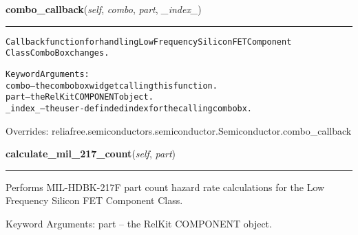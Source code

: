 \hspace{.8\funcindent}\begin{boxedminipage}{\funcwidth}

    \raggedright \textbf{combo\_callback}(\textit{self}, \textit{combo}, \textit{part}, \textit{\_index\_})

    \vspace{-1.5ex}

    \rule{\textwidth}{0.5\fboxrule}
\setlength{\parskip}{2ex}
\begin{alltt}
Callback function for handling Low Frequency Silicon FET Component
Class ComboBox changes.

Keyword Arguments:
  combo -- the combobox widget calling this function.
   part -- the RelKit COMPONENT object.
\_index\_ -- the user-definded index for the calling combobx.
\end{alltt}

\setlength{\parskip}{1ex}
      Overrides: reliafree.semiconductors.semiconductor.Semiconductor.combo\_callback

    \end{boxedminipage}

    \label{reliafree:semiconductors:transistor:LFSiFET:calculate_mil_217_count}

    \vspace{0.5ex}

\hspace{.8\funcindent}\begin{boxedminipage}{\funcwidth}

    \raggedright \textbf{calculate\_mil\_217\_count}(\textit{self}, \textit{part})

    \vspace{-1.5ex}

    \rule{\textwidth}{0.5\fboxrule}
\setlength{\parskip}{2ex}
    Performs MIL-HDBK-217F part count hazard rate calculations for the Low 
    Frequency Silicon FET Component Class.

    Keyword Arguments: part -- the RelKit COMPONENT object.

\setlength{\parskip}{1ex}
    \end{boxedminipage}

    \label{reliafree:semiconductors:transistor:LFSiFET:calculate_mil_217_stress}

